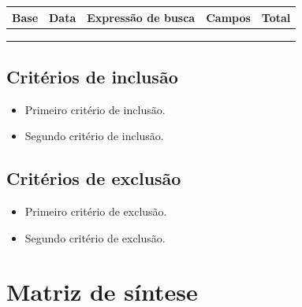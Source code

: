 \documentclass[12pt,a4paper]{article}
\begin{document}
\vspace{6pt}
{\footnotesize
\noindent\begin{tabularx}{\linewidth}{@{}p{2.1cm}p{1.8cm}Yp{2.0cm}p{1.1cm}@{}}
\toprule
\textbf{Base} & \textbf{Data} & \textbf{Expressão de busca} & \textbf{Campos} & \textbf{Total} \\
\midrule
 & & & & \\[10pt]
\midrule
 & & & & \\[10pt]
\midrule
 & & & & \\[10pt]
\bottomrule
\end{tabularx}}

\vspace{12pt}
\subsection*{Critérios de inclusão}
\begin{itemize}
  \item Primeiro critério de inclusão.
  \item Segundo critério de inclusão.
\end{itemize}

\subsection*{Critérios de exclusão}
\begin{itemize}
  \item Primeiro critério de exclusão.
  \item Segundo critério de exclusão.
\end{itemize}

\newpage
\section{Matriz de síntese}
%
%
\end{document}
